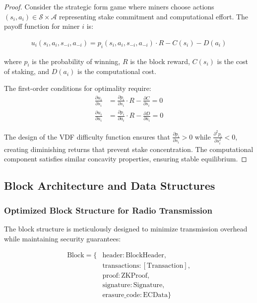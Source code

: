 \documentclass[11pt,a4paper]{article}
\begin{document}
\begin{proof}
Consider the strategic form game where miners choose actions $(s_i, a_i) \in \mathcal{S} \times \mathcal{A}$ representing stake commitment and computational effort. The payoff function for miner $i$ is:

\begin{align}
u_i(s_i, a_i, s_{-i}, a_{-i}) = p_i(s_i, a_i, s_{-i}, a_{-i}) \cdot R - C(s_i) - D(a_i)
\end{align}

where $p_i$ is the probability of winning, $R$ is the block reward, $C(s_i)$ is the cost of staking, and $D(a_i)$ is the computational cost.

The first-order conditions for optimality require:
\begin{align}
\frac{\partial u_i}{\partial s_i} &= \frac{\partial p_i}{\partial s_i} \cdot R - \frac{\partial C}{\partial s_i} = 0 \\
\frac{\partial u_i}{\partial a_i} &= \frac{\partial p_i}{\partial a_i} \cdot R - \frac{\partial D}{\partial a_i} = 0
\end{align}

The design of the VDF difficulty function ensures that $\frac{\partial p_i}{\partial s_i} > 0$ while $\frac{\partial^2 p_i}{\partial s_i^2} < 0$, creating diminishing returns that prevent stake concentration. The computational component satisfies similar concavity properties, ensuring stable equilibrium.
\end{proof}

\subsection{Block Architecture and Data Structures}

\subsubsection{Optimized Block Structure for Radio Transmission}

The block structure is meticulously designed to minimize transmission overhead while maintaining security guarantees:

\begin{align}
\text{Block} = \{&\text{header}: \text{BlockHeader},\\
&\text{transactions}: [\text{Transaction}],\\
&\text{proof}: \text{ZKProof},\\
&\text{signature}: \text{Signature},\\
&\text{erasure\_code}: \text{ECData}\}
\end{align}
\end{document}
